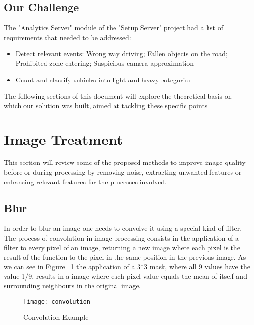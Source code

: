 \subsection{Our Challenge}

The "Analytics Server" module of the "Setup Server" project had a list of requirements that needed to be addressed:

\begin{itemize}
	\item Detect relevant events:
		\subitem Wrong way driving;
		\subitem Fallen objects on the road;
		\subitem Prohibited zone entering;
		\subitem Suspicious camera approximation
	\item Count and classify vehicles into light and heavy categories
\end{itemize}

The following sections of this document will explore the theoretical basis on which our solution was built, aimed at tackling these specific points.

\section{Image Treatment}

This section will review some of the proposed methods to improve image quality before or during processing by removing noise, extracting unwanted features or enhancing relevant features for the processes involved.

\subsection{Blur}

In order to blur an image one needs to convolve it using a special kind of filter. The process of convolution in image processing consists in the application of a filter to every pixel of an image, returning a new image where each pixel is the result of the function to the pixel in the same position in the previous image. As we can see in Figure ~\ref{fig:convolution} the application of a 3*3 mask, where all 9 values have the value 1/9, results in a image where each pixel value equals the mean of itself and surrounding neighbours in the original image.

\begin{figure}[h]
  \begin{center}
    \leavevmode
    \texttt{[image: convolution]}
    \caption{Convolution Example ~\cite{labs_theory_2017}}
    \label{fig:convolution}
  \end{center}
\end{figure}

